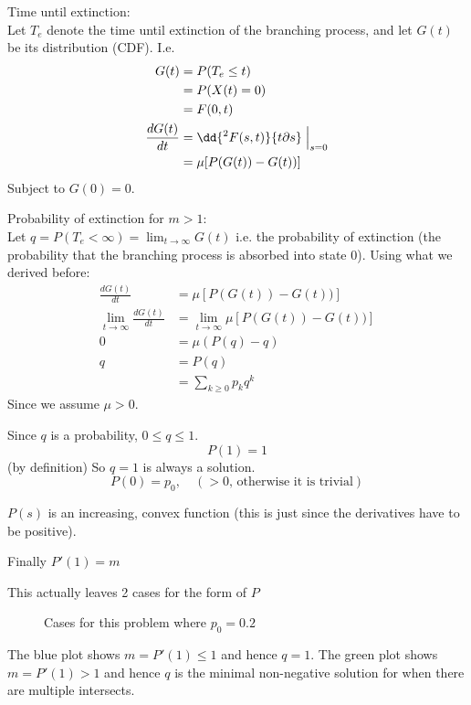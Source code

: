 \documentclass{/home/janmebows/Documents/LatexTemplates/myassignment}
\begin{document}
Time until extinction:\\
Let $T_e$ denote the time until extinction of the branching process, and let $G(t)$ be its distribution (CDF). I.e. 
\begin{align*}
    G(t) &= P(T_e \leq t)\\
    &= P(X(t) = 0)\\
    &= F(0,t)\\
    \frac{dG(t)}{dt} &=\dd{^2F(s,t)}{t\partial s} \Bigm|_{s=0}\\
    &= \mu[P(G(t)) - G(t))]\\
\end{align*}
Subject to $G(0) = 0$.

Probability of extinction for $m > 1$:\\
Let $q = P(T_e < \infty) = \lim_{t\to\infty} G(t)$ i.e. the probability of extinction (the probability that the branching process is absorbed into state 0). Using what we derived before:
\begin{align*}
    \frac{dG(t)}{dt} &= \mu[P(G(t)) - G(t))]\\
    \lim_{t\to\infty}\frac{dG(t)}{dt} &= \lim_{t\to\infty}\mu[P(G(t)) - G(t))]\\
    0 &= \mu (P(q) - q)\\
    q &= P(q)\\
    &= \sum_{k\geq0}p_k q^k
\end{align*}
Since we assume $\mu > 0$.

Since $q$ is a probability, $0\leq q \leq 1$. 
\[P(1) =1 \]
(by definition) So $q=1$ is always a solution.
\[P(0) = p_0,\quad (>0 \text{, otherwise it is trivial})\]

$P(s)$ is an increasing, convex function (this is just since the derivatives have to be positive).

Finally $P'(1) = m$


This actually leaves 2 cases for the form of $P$

\begin{figure}[h]
\centering
{}
\caption{Cases for this problem where $p_0 =0.2$}
\end{figure}
The blue plot shows $m=P'(1) \leq 1$ and hence $q=1$.
The green plot shows $m = P'(1) >1$ and hence $q$ is the minimal non-negative solution for when there are multiple intersects.
\end{document}
